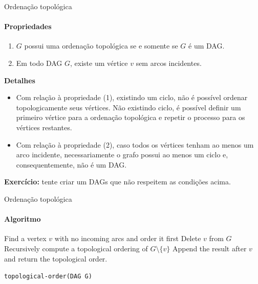 \begin{frame}{Ordenação topológica}
	\framesubtitle{Propriedades}


	\begin{enumerate}
		\item $G$ possui uma ordenação topológica se e somente se $G$ é um DAG.
		\item Em todo DAG $G$, existe um vértice $v$ sem arcos incidentes.
	\end{enumerate}
	
	\pause
	
	\smallskip
	
	\textbf{Detalhes}
	
	\begin{itemize}
		\item Com relação à propriedade (1), existindo um ciclo, não é possível ordenar topologicamente seus vértices. Não existindo ciclo, é possível definir um primeiro vértice para a ordenação topológica e repetir o processo para os vértices restantes.
		
		\item Com relação à propriedade (2), caso todos os vértices tenham ao menos um arco incidente, necessariamente o grafo possui ao menos um ciclo e, consequentemente, não é um DAG.
	\end{itemize}
	
	\textbf{Exercício:} tente criar um DAGs que não respeitem as condições acima.
	
\end{frame}



\begin{frame}{Ordenação topológica}
	\framesubtitle{Algoritmo}
	
	\begin{algorithm}[H]
		\DontPrintSemicolon
		
		Find a vertex $v$ with no incoming arcs and order it first\;
		Delete $v$ from $G$\;
		Recursively compute a topological ordering of $G \setminus \{v\}$\;
		Append the result after $v$ and return the topological order.\;
		
		\caption{\texttt{topological-order(DAG G)}}
	\end{algorithm}
\end{frame}



